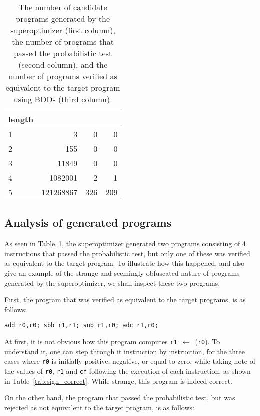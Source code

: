 \documentclass[a4paper,11pt]{kth-mag}
\renewcommand{\gets}{\leftarrow}
\begin{document}
\begin{table}
\centering
\tiny
\begin{tabular}{l|rrr}
length & & & \\
\hline
1 &         3 &   0 &   0 \\
2 &       155 &   0 &   0 \\
3 &     11849 &   0 &   0 \\
4 &   1082001 &   2 &   1 \\
5 & 121268867 & 326 & 209 \\
\end{tabular}
\caption{The number of candidate programs generated by the superoptimizer (first column), the number of programs that passed the probabilistic test (second column), and the number of programs verified as equivalent to the target program using BDDs (third column).}
\label{tab:num_programs}
\end{table}

\subsection{Analysis of generated programs}

As seen in Table~\ref{tab:num_programs}, the superoptimizer generated two programs consisting of 4 instructions that passed the probabilistic test, but only one of these was verified as equivalent to the target program.
To illustrate how this happened, and also give an example of the strange and seemingly obfuscated nature of programs generated by the superoptimizer, we shall inspect these two programs.

First, the program that was verified as equivalent to the target programs, is as follows:

\begin{verbatim}
add r0,r0; sbb r1,r1; sub r1,r0; adc r1,r0;
\end{verbatim}


At first, it is not obvious how this program computes \verb|r1|~$\gets$~(\verb|r0|).
To understand it, one can step through it instruction by instruction,
for the three cases where \verb|r0| is initially positive, negative, or equal to zero,
while taking note of the values of \verb|r0|, \verb|r1| and \verb|cf| following the execution of each instruction,
as shown in Table~\ref{tab:sign_correct}.
While strange, this program is indeed correct.

On the other hand, the program that passed the probabilistic test, but was rejected as not equivalent to the target program, is as follows:
\end{document}
